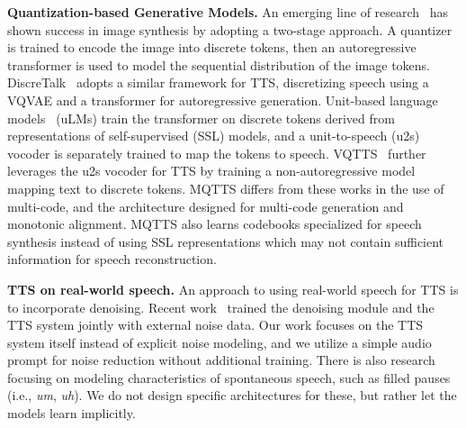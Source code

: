 \documentclass[letterpaper]{article} %
\begin{document}
\textbf{Quantization-based Generative Models.}
An emerging line of research~\cite{pmlr-v139-ramesh21a,Esser_2021_CVPR} has shown success in image synthesis by adopting a two-stage approach.
A quantizer is trained to encode the image into discrete tokens, then an autoregressive transformer is used to model the sequential distribution of the image tokens.
DiscreTalk~\cite{DBLP:journals/corr/abs-2005-05525} adopts a similar framework for TTS, discretizing speech using a VQVAE and a transformer for autoregressive generation.
Unit-based language models~\cite{10.1162/tacl_a_00430} (uLMs) train the transformer on discrete tokens derived from representations of self-supervised (SSL) models, and a unit-to-speech (u2s) vocoder is separately trained to map the tokens to speech.
VQTTS~\cite{du22b_interspeech} further leverages the u2s vocoder for TTS by training a non-autoregressive model mapping text to discrete tokens.
MQTTS differs from these works in the use of multi-code, and the architecture designed for multi-code generation and monotonic alignment.
MQTTS also learns codebooks specialized for speech synthesis instead of using SSL representations which may not contain sufficient information for speech reconstruction.

\textbf{TTS on real-world speech.}
An approach to using real-world speech for TTS is to incorporate denoising.
Recent work~\cite{DBLP:conf/icassp/Zhang00LZQZL21} trained the denoising module and the TTS system jointly with external noise data.
Our work focuses on the TTS system itself instead of explicit noise modeling, and we utilize a simple audio prompt for noise reduction without additional training.
There is also research~\cite{DBLP:journals/corr/abs-2107-02530} focusing on modeling characteristics of spontaneous speech, such as filled pauses (i.e., \textit{um}, \textit{uh}).
We do not design specific architectures for these, but rather let the models learn implicitly.


\end{document}
